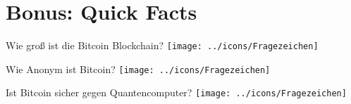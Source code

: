 \documentclass[aspectratio=169]{beamer}
\begin{document}







\section{Bonus: Quick Facts}

\begin{frame}{Wie groß ist die Bitcoin Blockchain?}
    \texttt{[image: ../icons/Fragezeichen]}
\end{frame}


\begin{frame}{Wie Anonym ist Bitcoin?}
    \texttt{[image: ../icons/Fragezeichen]}
\end{frame}


\begin{frame}{Ist Bitcoin sicher gegen Quantencomputer?}
    \texttt{[image: ../icons/Fragezeichen]}
\end{frame}
\end{document}
